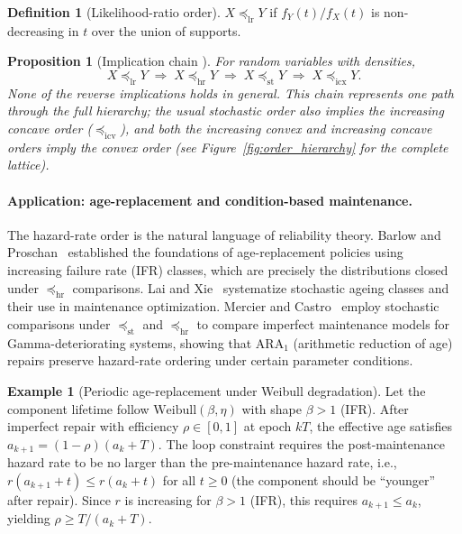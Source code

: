 \documentclass[11pt,a4paper]{article}
\theoremstyle{plain}
\newtheorem{proposition}[theorem]{Proposition}
\theoremstyle{definition}
\newtheorem{definition}[theorem]{Definition}
\newtheorem{example}[theorem]{Example}
\theoremstyle{remark}
\begin{document}
\begin{definition}[Likelihood-ratio order]
\label{def:lr}
$X \preceq_{\mathrm{lr}} Y$ if $f_Y(t)/f_X(t)$ is non-decreasing in
$t$ over the union of supports.
\end{definition}

\begin{proposition}[Implication chain {\cite[Ch.~1]{shaked2007}}]
\label{prop:chain}
For random variables with densities,
\[
  X \preceq_{\mathrm{lr}} Y
  \;\Longrightarrow\;
  X \preceq_{\mathrm{hr}} Y
  \;\Longrightarrow\;
  X \preceq_{\mathrm{st}} Y
  \;\Longrightarrow\;
  X \preceq_{\mathrm{icx}} Y.
\]
None of the reverse implications holds in general.
This chain represents one path through the full hierarchy;
the usual stochastic order also implies the increasing concave
order ($\preceq_{\mathrm{icv}}$), and both the increasing convex
and increasing concave orders imply the convex order
(see Figure~\ref{fig:order_hierarchy} for the complete lattice).
\end{proposition}

\paragraph{Application: age-replacement and condition-based maintenance.}
The hazard-rate order is the natural language of reliability theory.
Barlow and Proschan~\cite{barlow1996} established the foundations of
age-replacement policies using increasing failure rate (IFR) classes,
which are precisely the distributions closed under $\preceq_{\mathrm{hr}}$
comparisons.  Lai and Xie~\cite{lai2006} systematize stochastic ageing
classes and their use in maintenance optimization.  Mercier and
Castro~\cite{mercier2019} employ stochastic comparisons under
$\preceq_{\mathrm{st}}$ and $\preceq_{\mathrm{hr}}$ to compare
imperfect maintenance models for Gamma-deteriorating systems, showing
that $\mathrm{ARA}_1$ (arithmetic reduction of age) repairs preserve
hazard-rate ordering under certain parameter conditions.

\begin{example}[Periodic age-replacement under Weibull degradation]
\label{ex:weibull}
Let the component lifetime follow $\mathrm{Weibull}(\beta, \eta)$ with
shape $\beta > 1$ (IFR).  After imperfect repair with efficiency
$\rho \in [0,1]$ at epoch $kT$, the effective age satisfies
$a_{k+1} = (1-\rho)(a_k + T)$.  The loop constraint requires the
post-maintenance hazard rate to be no larger than the pre-maintenance
hazard rate, i.e., $r(a_{k+1}+t) \le r(a_k+t)$ for all $t \ge 0$
(the component should be ``younger'' after repair).
Since $r$ is increasing for $\beta > 1$ (IFR), this requires
$a_{k+1} \le a_k$, yielding $\rho \ge T/(a_k + T)$.
\end{example}
\end{document}
